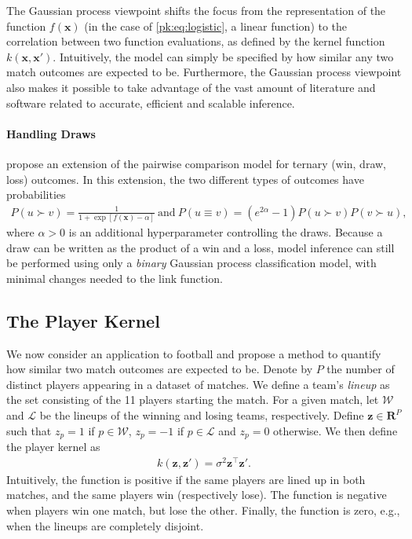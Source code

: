 The Gaussian process viewpoint shifts the focus from the representation of the function $f(\bm{x})$ (in the case of \eqref{pk:eq:logistic}, a linear function) to the correlation between two function evaluations, as defined by the kernel function $k(\bm{x}, \bm{x}')$.
Intuitively, the model can simply be specified by how similar any two match outcomes are expected to be.
Furthermore, the Gaussian process viewpoint also makes it possible to take advantage of the vast amount of literature and software related to accurate, efficient and scalable inference.


\paragraph{Handling Draws}
\citet{rao1967ties} propose an extension of the pairwise comparison model for ternary (win, draw, loss) outcomes.
In this extension, the two different types of outcomes have probabilities
\begin{align*}
P(u \succ v) = \frac{1}{1 + \exp[f(\bm{x}) - \alpha]}\ \text{and}\ 
P(u \equiv v) = (e^{2 \alpha} - 1) P(u \succ v) P(v \succ u),
\end{align*}
where $\alpha > 0$ is an additional hyperparameter controlling the draws.
Because a draw can be written as the product of a win and a loss, model inference can still be performed using only a \emph{binary} Gaussian process classification model, with minimal changes needed to the link function.


\subsection{The Player Kernel}

We now consider an application to football and propose a method to quantify how similar two match outcomes are expected to be.
Denote by $P$ the number of distinct players appearing in a dataset of matches.
We define a team's \emph{lineup} as the set consisting of the \num{11} players starting the match.
For a given match, let $\mathcal{W}$ and $\mathcal{L}$ be the lineups of the winning and losing teams, respectively.
Define $\bm{z} \in \mathbf{R}^P$ such that $z_p = 1$ if $p \in \mathcal{W}$, $z_p = -1$ if $p \in \mathcal{L}$ and $z_p = 0$ otherwise.
We then define the player kernel as
\begin{align*}
k(\bm{z}, \bm{z}') = \sigma^2 \bm{z}^\top \bm{z}'.
\end{align*}
Intuitively, the function is positive if the same players are lined up in both matches, and the same players win (respectively lose).
The function is negative when players win one match, but lose the other.
Finally, the function is zero, e.g., when the lineups are completely disjoint.

